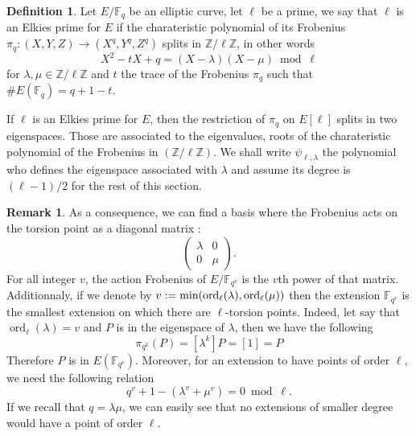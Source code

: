 \documentclass[12pt]{article}
\theoremstyle{plain}
\theoremstyle{definition}
\newtheorem{definition}[theorem]{Definition}
\newtheorem*{remark}{Remark}
\DeclareMathOperator{\order}{ord} %
\def\Z{\ensuremath{\mathbb{Z}}}
\def\F{\ensuremath{\mathbb{F}}}
\begin{document}
\begin{definition}
Let $E/\F_q$ be an elliptic curve, let $\ell$ be a prime, we say that $\ell$
is an Elkies prime for $E$ if the charateristic polynomial of its Frobenius
$\pi_q : (X, Y, Z) \to (X^q, Y^q, Z^q)$ splits in $\Z/\ell\Z$, in other words
\begin{equation}
X^2-tX+q=(X-\lambda)(X-\mu)\bmod\ell
\end{equation}
for $\lambda,\mu\in\Z/\ell\Z$ and $t$ the trace of the Frobenius $\pi_q$ such that 
$\#E(\F_q)=q+1-t$.
\end{definition}

If $\ell$ is an Elkies prime for $E$, then the restriction of $\pi_q$ on
$E[\ell]$ splits in two eigenspaces. Those are associated to the eigenvalues,
roots of the charateristic polynomial of the Frobenius in $(\Z/\ell\Z)$. 
We shall write $\psi_{\ell,\lambda}$ the polynomial who defines the eigenspace 
associated with $\lambda$ and assume its degree is $(\ell - 1)/2$ for the rest
of this section. 

\begin{remark}
As a consequence, we can find a basis where the Frobenius acts on the torsion 
point as a diagonal matrix :
\begin{equation}
\begin{pmatrix}
\lambda & 0\\
0 & \mu
\end{pmatrix}.
\end{equation}
For all integer $v$, the action Frobenius of $E/\F_{q^v}$ is the $v$th
power of that matrix. Additionnaly, if we denote by $v :=
\textup{min}(\order_\ell(\lambda),\order_\ell(\mu))$ then the extension $\F_{q^v}$ is
the smallest extension on which there are $\ell$-torsion points. Indeed, let 
say that $\order_\ell(\lambda) = v$ and $P$ is in the eigenspace of $\lambda$, 
then we have the following
\begin{equation}
\pi_{q^k}(P)=[\lambda^k]P=[1]=P
\end{equation}
Therefore $P$ is in $E(\F_{q^v})$. Moreover, for an extension to have points of
order $\ell$, we need the following relation
\begin{equation}
q^v + 1 - (\lambda^v + \mu^v) = 0 \bmod \ell.
\end{equation}
If we recall that $q=\lambda\mu$, we can easily see that no extensions of
smaller degree would have a point of order $\ell$.
\end{remark}
\end{document}
